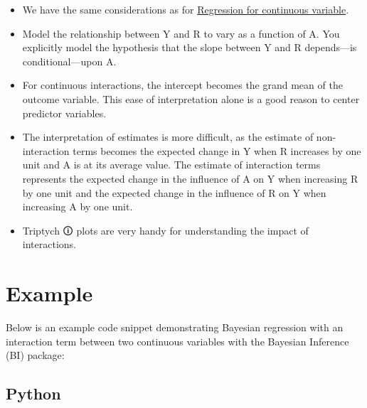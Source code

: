 \documentclass[
  letterpaper,
  DIV=11,
  numbers=noendperiod]{scrreprt}
\begin{document}
\begin{tcolorbox}[enhanced jigsaw, toptitle=1mm, opacityback=0, titlerule=0mm, breakable, bottomrule=.15mm, colframe=quarto-callout-caution-color-frame, arc=.35mm, coltitle=black, left=2mm, opacitybacktitle=0.6, leftrule=.75mm, toprule=.15mm, rightrule=.15mm, bottomtitle=1mm, colbacktitle=quarto-callout-caution-color!10!white, title=\textcolor{quarto-callout-caution-color}{\faFire}\hspace{0.5em}{Caution}, colback=white]

\begin{itemize}
\item
  We have the same considerations as for
  \href{1.\%20Linear\%20Regression\%20for\%20continuous\%20variable.qmd}{Regression
  for continuous variable}.
\item
  Model the relationship between Y and R to vary as a function of A. You
  explicitly model the hypothesis that the slope between Y and R
  depends---is conditional---upon A.
\item
  For continuous interactions, the intercept becomes the grand mean of
  the outcome variable. This ease of interpretation alone is a good
  reason to center predictor variables.
\item
  The interpretation of estimates is more difficult, as the estimate of
  non-interaction terms becomes the expected change in Y when R
  increases by one unit and A is at its average value. The estimate of
  interaction terms represents the expected change in the influence of A
  on Y when increasing R by one unit and the expected change in the
  influence of R on Y when increasing A by one unit.
\item
  \label{triptych}{{Triptych 🛈}} plots are very handy for
  understanding the impact of interactions.
\end{itemize}

\end{tcolorbox}

\section{Example}\label{example-2}

Below is an example code snippet demonstrating Bayesian regression with
an interaction term between two continuous variables with the Bayesian
Inference (BI) package:

\subsection{Python}
\end{document}
